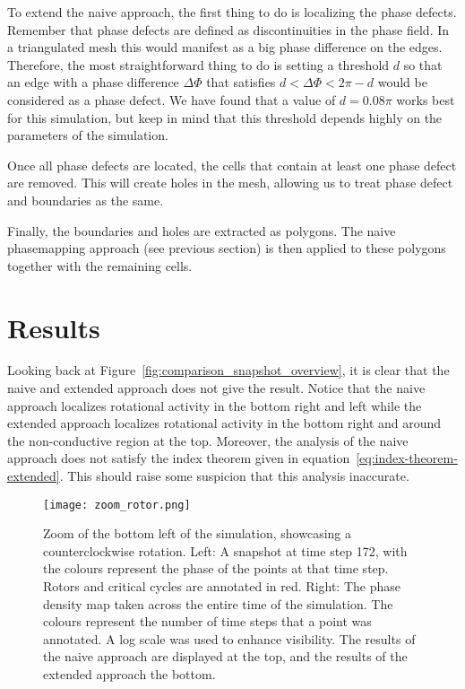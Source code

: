 \documentclass[twocolumn]{article}
\begin{document}
To extend the naive approach, the first thing to do is localizing the
phase defects. Remember that phase defects are defined as
discontinuities in the phase field. In a triangulated mesh this would
manifest as a big phase difference on the edges. Therefore, the most
straightforward thing to do is setting a threshold \(d\) so that an edge
with a phase difference \(\Delta\Phi\) that satisfies
\(d<\Delta\Phi<2\pi-d\) would be considered as a phase defect. We have
found that a value of \(d=0.08\pi\) works best for this simulation, but
keep in mind that this threshold depends highly on the parameters of the
simulation.

Once all phase defects are located, the cells that contain at least one
phase defect are removed. This will create holes in the mesh, allowing
us to treat phase defect and boundaries as the same.

Finally, the boundaries and holes are extracted as polygons. The naive
phasemapping approach (see previous section) is then applied to these
polygons together with the remaining cells.

\section{Results}\label{results}

Looking back at Figure~\ref{fig:comparison_snapshot_overview}, it is
clear that the naive
and extended approach does not give the result. Notice that the naive
approach localizes rotational activity in the bottom right and left
while the extended approach localizes rotational activity in the bottom
right and around the non-conductive region at the top. Moreover, the
analysis of the naive approach does not satisfy the index theorem given
in equation~\ref{eq:index-theorem-extended}. This should raise some
suspicion that this analysis
inaccurate.

\begin{figure}[ht]
  \centering
  \texttt{[image: zoom\_rotor.png]}
  \caption{Zoom of the bottom left of the simulation, showcasing a
    counterclockwise rotation. Left: A snapshot at time step 172, with the
    colours represent the phase of the points at that time step. Rotors and
    critical cycles are annotated in red. Right: The phase density map taken
    across the entire time of the simulation. The colours represent the
    number of time steps that a point was annotated. A log scale was used to
    enhance visibility. The results of the naive approach are displayed at
  the top, and the results of the extended approach the bottom.}
  \label{fig:zoom-rotor}
\end{figure}
\end{document}
